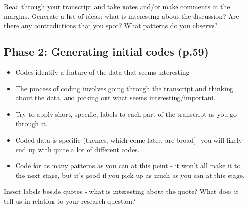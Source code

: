 \documentclass[
  english,
  letterpaper,
  DIV=11,
  numbers=noendperiod]{scrreprt}
\providecommand{\tightlist}{%
  \setlength{\itemsep}{0pt}\setlength{\parskip}{0pt}}
\begin{document}
\begin{tcolorbox}[enhanced jigsaw, breakable, bottomtitle=1mm, leftrule=.75mm, opacityback=0, colbacktitle=quarto-callout-warning-color!10!white, opacitybacktitle=0.6, toprule=.15mm, colback=white, left=2mm, coltitle=black, bottomrule=.15mm, titlerule=0mm, title={Practical Steps}, toptitle=1mm, colframe=quarto-callout-warning-color-frame, arc=.35mm, rightrule=.15mm]

Read through your transcript and take notes and/or make comments in the
margins. Generate a list of ideas: what is interesting about the
discussion? Are there any contradictions that you spot? What patterns do
you observe?

\end{tcolorbox}

\subsection{Phase 2: Generating initial codes
(p.59)}\label{phase-2-generating-initial-codes-p.59}

\begin{itemize}
\tightlist
\item
  Codes identify a feature of the data that seems interesting
\item
  The process of coding involves going through the transcript and
  thinking about the data, and picking out what seems
  interesting/important.
\item
  Try to apply short, specific, labels to each part of the transcript as
  you go through it.
\item
  Coded data is specific (themes, which come later, are broad) -you will
  likely end up with quite a lot of different codes.
\item
  Code for as many patterns as you can at this point - it won't all make
  it to the next stage, but it's good if you pick up as much as you can
  at this stage.
\end{itemize}

\begin{tcolorbox}[enhanced jigsaw, breakable, bottomtitle=1mm, leftrule=.75mm, opacityback=0, colbacktitle=quarto-callout-warning-color!10!white, opacitybacktitle=0.6, toprule=.15mm, colback=white, left=2mm, coltitle=black, bottomrule=.15mm, titlerule=0mm, title={Practical Steps}, toptitle=1mm, colframe=quarto-callout-warning-color-frame, arc=.35mm, rightrule=.15mm]

Insert labels beside quotes - what is interesting about the quote? What
does it tell us in relation to your research question?

\end{tcolorbox}
\end{document}
